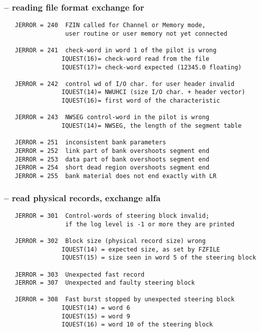 \subsubsection*{ -- reading file format exchange for }

\begin{verbatim}
   JERROR = 240  FZIN called for Channel or Memory mode,
                 user routine or user memory not yet connected

   JERROR = 241  check-word in word 1 of the pilot is wrong
                IQUEST(16)= check-word read from the file
                IQUEST(17)= check-word expected (12345.0 floating)

   JERROR = 242  control wd of I/O char. for user header invalid
                IQUEST(14)= NWUHCI (size I/O char. + header vector)
                IQUEST(16)= first word of the characteristic

   JERROR = 243  NWSEG control-word in the pilot is wrong
                IQUEST(14)= NWSEG, the length of the segment table

   JERROR = 251  inconsistent bank parameters
   JERROR = 252  link part of bank overshoots segment end
   JERROR = 253  data part of bank overshoots segment end
   JERROR = 254  short dead region overshoots segment end
   JERROR = 255  bank material does not end exactly with LR
\end{verbatim}

\subsubsection*{ -- read physical records, exchange alfa}

\begin{verbatim}
   JERROR = 301  Control-words of steering block invalid;
                 if the log level is -1 or more they are printed

   JERROR = 302  Block size (physical record size) wrong
                IQUEST(14) = expected size, as set by FZFILE
                IQUEST(15) = size seen in word 5 of the steering block

   JERROR = 303  Unexpected fast record
   JERROR = 307  Unexpected and faulty steering block

   JERROR = 308  Fast burst stopped by unexpected steering block
                IQUEST(14) = word 6
                IQUEST(15) = word 9
                IQUEST(16) = word 10 of the steering block
\end{verbatim}

